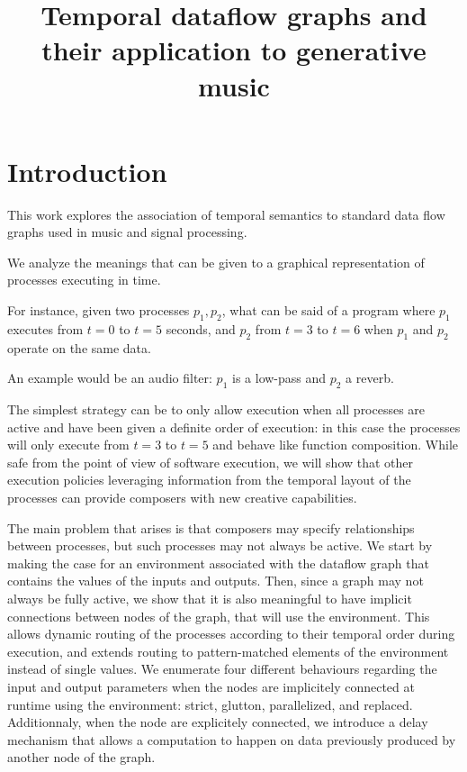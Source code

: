 \documentclass{article}
\title{Temporal dataflow graphs and their application to generative music}
\begin{document}
    
    \capstartfalse
    \maketitle
    \capstarttrue
    
	\section{Introduction}
    This work explores the association of temporal semantics to standard data flow graphs used in music and signal processing.
    
    We analyze the meanings that can be given to a graphical representation of processes executing in time. 
    
    For instance, given two processes $p_1, p_2$, what can be said of a program where $p_1$ executes from $t=0$ to $t=5$ seconds, and $p_2$ from $t=3$ to $t=6$ when $p_1$ and $p_2$ operate on the same data.
    
    An example would be an audio filter: $p_1$ is a low-pass and $p_2$ a reverb.
    
    The simplest strategy can be to only allow execution when all processes are active and have been given a definite order of execution: in this case the processes will only execute from $t=3$ to $t=5$ and behave like function composition. 
    While safe from the point of view of software execution, we will show that other execution policies leveraging information from the temporal layout of the processes can provide composers with new creative capabilities.
    
    The main problem that arises is that composers may specify relationships between processes, but such processes may not always be active. 
    We start by making the case for an environment associated with the dataflow graph that contains the values of the inputs and outputs.
    Then, since a graph may not always be fully active, we show that it is also meaningful to have implicit connections between nodes of the graph, that will use the environment.
    This allows dynamic routing of the processes according to their temporal order during execution, and extends routing to pattern-matched elements of the environment instead of single values.
    We enumerate four different behaviours regarding the input and output parameters when the nodes are implicitely connected at runtime using the environment: strict, glutton, parallelized, and replaced. 
    Additionnaly, when the node are explicitely connected, we introduce a delay mechanism that allows a computation to happen on data previously produced by another node of the graph.
\end{document}
